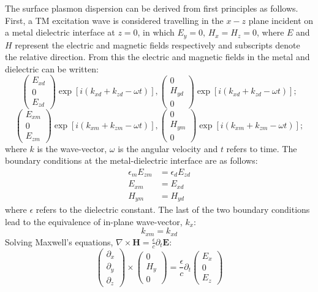 The surface plasmon dispersion can be derived from first principles as follows. First, a TM excitation wave is considered travelling in the $x-z$ plane incident on a metal dielectric interface at $z=0$, in which $E_y = 0$, $H_x = H_z = 0$, where $E$ and $H$ represent the electric and magnetic fields respectively and subscripts denote the relative direction. From this the electric and magnetic fields in the metal and dielectric can be written:
\begin{equation}
\begin{pmatrix}
E_{xd} \\
0 \\
E_{zd}
\end{pmatrix} \exp[i(k_{xd}+k_{zd}-\omega t)],
\begin{pmatrix}
0\\
H_{yd} \\
0
\end{pmatrix} \exp[i(k_{xd}+k_{zd}-\omega t)];
\end{equation}
\begin{equation}
\begin{pmatrix}
E_{xm} \\
0 \\
E_{zm}
\end{pmatrix} \exp[i(k_{xm}+k_{zm}-\omega t)],
\begin{pmatrix}
0\\
H_{ym} \\
0
\end{pmatrix} \exp[i(k_{xm}+k_{zm}-\omega t)];
\end{equation}
where $k$ is the wave-vector, $\omega$ is the angular velocity and $t$ refers to time. The boundary conditions at the metal-dielectric interface are as follows:
\begin{equation}
\begin{split}
\epsilon_mE_{zm} &= \epsilon_dE_{zd}\\
E_{xm} &= E_{xd}\\
H_{ym} &= H_{yd}
\end{split}
\end{equation}
where $\epsilon$ refers to the dielectric constant. The last of the two boundary conditions lead to the equivalence of in-plane wave-vector, $k_x$:
\begin{equation}
k_{xm} = k_{xd}
\end{equation}
Solving Maxwell's equations, $\nabla\times \mathbf{H} = \frac{\epsilon}{c}\partial_t\mathbf{E}$:
\begin{equation}
\begin{pmatrix}\partial_x\\\partial_y\\\partial_z\end{pmatrix}\times
\begin{pmatrix}0\\H_y\\0\end{pmatrix} = \frac{\epsilon}{c}\partial_t
\begin{pmatrix}E_x\\0\\E_z\end{pmatrix}
\end{equation}
